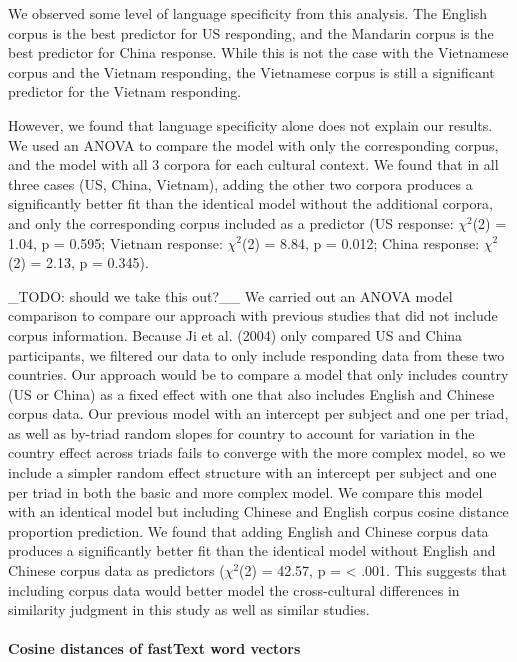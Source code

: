 \documentclass[10pt, letterpaper]{article}
\begin{document}
We observed some level of language specificity from this analysis. The
English corpus is the best predictor for US responding, and the Mandarin
corpus is the best predictor for China response. While this is not the
case with the Vietnamese corpus and the Vietnam responding, the
Vietnamese corpus is still a significant predictor for the Vietnam
responding.

However, we found that language specificity alone does not explain our
results. We used an ANOVA to compare the model with only the
corresponding corpus, and the model with all 3 corpora for each cultural
context. We found that in all three cases (US, China, Vietnam), adding
the other two corpora produces a significantly better fit than the
identical model without the additional corpora, and only the
corresponding corpus included as a predictor (US response: \(\chi^2\)(2)
= 1.04, p = 0.595; Vietnam response: \(\chi^2\)(2) = 8.84, p = 0.012;
China response: \(\chi^2\)(2) = 2.13, p = 0.345).

\_TODO: should we take this out?\_\_ We carried out an ANOVA model
comparison to compare our approach with previous studies that did not
include corpus information. Because Ji et al. (2004) only compared US
and China participants, we filtered our data to only include responding
data from these two countries. Our approach would be to compare a model
that only includes country (US or China) as a fixed effect with one that
also includes English and Chinese corpus data. Our previous model with
an intercept per subject and one per triad, as well as by-triad random
slopes for country to account for variation in the country effect across
triads fails to converge with the more complex model, so we include a
simpler random effect structure with an intercept per subject and one
per triad in both the basic and more complex model. We compare this
model with an identical model but including Chinese and English corpus
cosine distance proportion prediction. We found that adding English and
Chinese corpus data produces a significantly better fit than the
identical model without English and Chinese corpus data as predictors
(\(\chi^2\)(2) = 42.57, p = \textless{} .001. This suggests that
including corpus data would better model the cross-cultural differences
in similarity judgment in this study as well as similar studies.

\hypertarget{cosine-distances-of-fasttext-word-vectors-1}{%
\paragraph{Cosine distances of fastText word
vectors}\label{cosine-distances-of-fasttext-word-vectors-1}}
\end{document}
